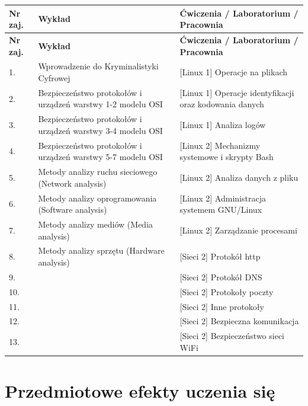 \documentclass[12pt, a4paper]{article}
\newcommand{\thdrule}{\noalign{\global\setlength{\extrarowheight}{0pt}}}
\newcommand{\thdend}{\noalign{\global\setlength{\extrarowheight}{3pt}}}
\begin{document}
{\scriptsize
\begin{longtable}{m{1.5cm}m{6.5cm}m{6.5cm}}
\thdrule\toprule
\rowcolor{pjatkRed} {\color{white}\textbf{Nr zaj.}} & {\color{white}\textbf{Wykład}} & {\color{white}\textbf{Ćwiczenia / Laboratorium / Pracownia}} \\
\midrule\thdend
\endfirsthead
\thdrule\toprule
\rowcolor{pjatkRed} {\color{white}\textbf{Nr zaj.}} & {\color{white}\textbf{Wykład}} & {\color{white}\textbf{Ćwiczenia / Laboratorium / Pracownia}} \\
\midrule\thdend
\endhead
  \rowcolor{tableRowLight} 1. & Wprowadzenie do Kryminalistyki Cyfrowej & {[}Linux 1{]} Operacje na plikach \\
  \rowcolor{tableRowAlt} 2. & Bezpieczeństwo protokołów i urządzeń warstwy 1-2 modelu OSI & {[}Linux 1{]} Operacje identyfikacji oraz kodowania danych \\
  \rowcolor{tableRowLight} 3. & Bezpieczeństwo protokołów i urządzeń warstwy 3-4 modelu OSI & {[}Linux 1{]} Analiza logów \\
  \rowcolor{tableRowAlt} 4. & Bezpieczeństwo protokołów i urządzeń warstwy 5-7 modelu OSI & {[}Linux 2{]} Mechanizmy systemowe i skrypty Bash \\
  \rowcolor{tableRowLight} 5. & Metody analizy ruchu sieciowego (Network analysis) & {[}Linux 2{]} Analiza danych z pliku \\
  \rowcolor{tableRowAlt} 6. & Metody analizy oprogramowania (Software analysis) & {[}Linux 2{]} Administracja systemem GNU/Linux \\
  \rowcolor{tableRowLight} 7. & Metody analizy mediów (Media analysis) & {[}Linux 2{]} Zarządzanie procesami \\
  \rowcolor{tableRowAlt} 8. & Metody analizy sprzętu (Hardware analysis) & {[}Sieci 2{]} Protokół http \\
  \rowcolor{tableRowLight} 9. &  & {[}Sieci 2{]} Protokół DNS \\
  \rowcolor{tableRowAlt} 10. &  & {[}Sieci 2{]} Protokoły poczty \\
  \rowcolor{tableRowLight} 11. &  & {[}Sieci 2{]} Inne protokoły \\
  \rowcolor{tableRowAlt} 12. &  & {[}Sieci 2{]} Bezpieczna komunikacja \\
  \rowcolor{tableRowLight} 13. &  & {[}Sieci 2{]} Bezpieczeństwo sieci WiFi \\
\bottomrule
\end{longtable}}

\section{Przedmiotowe efekty uczenia się}
\end{document}
